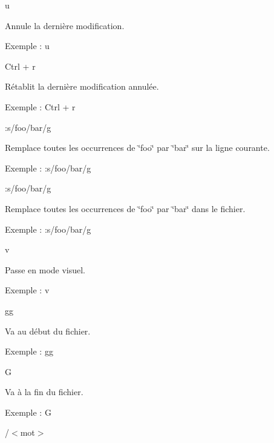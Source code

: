 \begin{DoxyEnumerate}
\item {\ttfamily u}
\begin{DoxyItemize}
\item Annule la dernière modification.
\item Exemple \+: {\ttfamily u}
\end{DoxyItemize}
\item {\ttfamily Ctrl + r}
\begin{DoxyItemize}
\item Rétablit la dernière modification annulée.
\item Exemple \+: {\ttfamily Ctrl + r}
\end{DoxyItemize}
\item {\ttfamily \+:s/foo/bar/g}
\begin{DoxyItemize}
\item Remplace toutes les occurrences de \char`\"{}foo\char`\"{} par \char`\"{}bar\char`\"{} sur la ligne courante.
\item Exemple \+: {\ttfamily \+:s/foo/bar/g}
\end{DoxyItemize}
\item {\ttfamily \+:s/foo/bar/g}
\begin{DoxyItemize}
\item Remplace toutes les occurrences de \char`\"{}foo\char`\"{} par \char`\"{}bar\char`\"{} dans le fichier.
\item Exemple \+: {\ttfamily \+:s/foo/bar/g}
\end{DoxyItemize}
\item {\ttfamily v}
\begin{DoxyItemize}
\item Passe en mode visuel.
\item Exemple \+: {\ttfamily v}
\end{DoxyItemize}
\item {\ttfamily gg}
\begin{DoxyItemize}
\item Va au début du fichier.
\item Exemple \+: {\ttfamily gg}
\end{DoxyItemize}
\item {\ttfamily G}
\begin{DoxyItemize}
\item Va à la fin du fichier.
\item Exemple \+: {\ttfamily G}
\end{DoxyItemize}
\item {\ttfamily /$<$mot$>$}
\begin{DoxyItemize}

\end{DoxyItemize}
\end{DoxyEnumerate}
